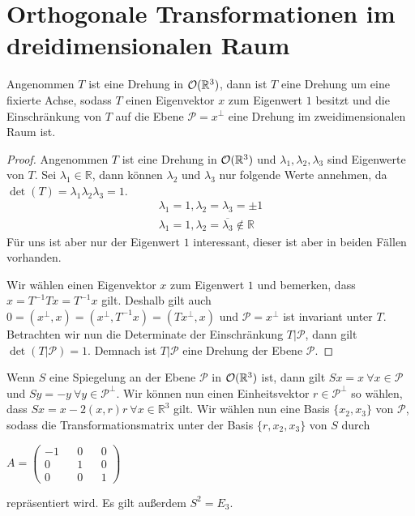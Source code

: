 \section{Orthogonale Transformationen im dreidimensionalen Raum}
\begin{theorem}
 Angenommen $T$ ist eine Drehung in ${\mathcal{O}(\mathbb{R}^3)}$, dann ist $T$ eine Drehung um eine fixierte Achse, sodass $T$ einen Eigenvektor $x$ zum Eigenwert $1$ besitzt und die Einschränkung von $T$ auf die Ebene $\mathcal{P}=x^{\perp}$ eine Drehung im zweidimensionalen Raum ist.
\end{theorem}
\begin{proof}
 Angenommen $T$ ist eine Drehung in ${\mathcal{O}(\mathbb{R}^3)}$ und $\lambda_1,\lambda_2,\lambda_3$ sind Eigenwerte von $T$. Sei $\lambda_1 \in \mathbb{R}$, dann können $\lambda_2$ und $\lambda_3$ nur folgende Werte annehmen, da $\det(T)=\lambda_1\lambda_2\lambda_3=1$.
 \begin{align}
  \lambda_1=1, \lambda_2=\lambda_3=\pm1 \\
  \lambda_1=1, \lambda_2=\overline{\lambda_3}\notin \mathbb{R}
 \end{align}
Für uns ist aber nur der Eigenwert $1$ interessant, dieser ist aber in beiden Fällen vorhanden.

Wir wählen einen Eigenvektor $x$ zum Eigenwert $1$ und bemerken, dass $x=T^{-1}Tx=T^{-1}x$ gilt. Deshalb gilt auch $0=(x^{\perp},x)=(x^{\perp},T^{-1}x)=(Tx^{\perp},x)$ und $\mathcal{P}=x^{\perp}$ ist invariant unter $T$. Betrachten wir nun die Determinate der Einschränkung $T|\mathcal{P}$, dann gilt $\det(T|\mathcal{P})=1$. Demnach ist $T|\mathcal{P}$ eine Drehung der Ebene $\mathcal{P}$.
\end{proof}
\begin{bem}
 Wenn $S$ eine Spiegelung an der Ebene $\mathcal{P}$ in ${\mathcal{O}(\mathbb{R}^3)}$ ist, dann gilt $Sx=x \ \forall x \in \mathcal{P}$ und $Sy=-y \ \forall y \in \mathcal{P}^{\perp}$. Wir können nun einen Einheitsvektor $r \in \mathcal{P}^{\perp}$ so wählen, dass $Sx=x-2(x,r)r \ \forall x\in \mathbb{R}^3$ gilt. Wir wählen nun eine Basis $\{x_2,x_3\}$ von $\mathcal{P}$, sodass die Transformationsmatrix unter der Basis $\{r,x_2,x_3\}$ von $S$ durch 
 \begin{center}
  $A= \begin{pmatrix}
        -1 && 0 && 0 \\
        0 && 1 && 0 \\
        0 && 0 && 1 
       \end{pmatrix}$
 \end{center}
repräsentiert wird. Es gilt außerdem $S^2 = E_3$.
\end{bem}
